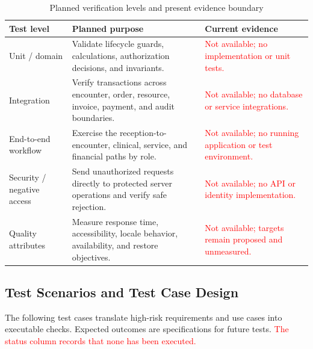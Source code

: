 \documentclass[a4paper,12pt]{article}
\newcommand{\weak}[1]{\textcolor{red}{#1}}
\begin{document}
\begin{table}[H]
\centering
\small
\renewcommand{\arraystretch}{1.12}
\begin{tabularx}{\textwidth}{@{}P{0.22\textwidth}P{0.34\textwidth}Y@{}}
\toprule
Test level & Planned purpose & Current evidence \\
\midrule
Unit / domain & Validate lifecycle guards, calculations, authorization decisions, and invariants. & \weak{Not available; no implementation or unit tests.} \\
Integration & Verify transactions across encounter, order, resource, invoice, payment, and audit boundaries. & \weak{Not available; no database or service integrations.} \\
End-to-end workflow & Exercise the reception-to-encounter, clinical, service, and financial paths by role. & \weak{Not available; no running application or test environment.} \\
Security / negative access & Send unauthorized requests directly to protected server operations and verify safe rejection. & \weak{Not available; no API or identity implementation.} \\
Quality attributes & Measure response time, accessibility, locale behavior, availability, and restore objectives. & \weak{Not available; targets remain proposed and unmeasured.} \\
\bottomrule
\end{tabularx}
\caption{Planned verification levels and present evidence boundary}
\label{tab:test-levels}
\end{table}

\subsection{Test Scenarios and Test Case Design}
The following test cases translate high-risk requirements and use cases into executable checks. Expected outcomes are specifications for future tests. \weak{The status column records that none has been executed.}
\end{document}
